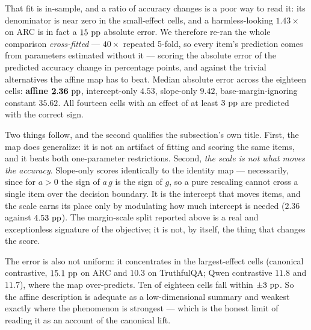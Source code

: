 That fit is in-sample, and a ratio of accuracy changes is a poor way to read it: its
denominator is near zero in the small-effect cells, and a harmless-looking $1.43\times$
on ARC is in fact a $15\,\,\mathrm{pp}$ absolute error. We therefore re-ran the whole comparison
\emph{cross-fitted} --- $40 \times$ repeated 5-fold, so every item's prediction comes
from parameters estimated without it --- scoring the absolute error of the predicted
accuracy change in percentage points, and against the trivial alternatives the affine
map has to beat. Median absolute error across the eighteen cells: \textbf{affine
$\mathbf{2.36\,\,\mathrm{pp}}$}, intercept-only $4.53$, slope-only $9.42$, base-margin-ignoring
constant $35.62$. All fourteen cells with an effect of at least $3\,\,\mathrm{pp}$ are predicted
with the correct sign.

Two things follow, and the second qualifies the subsection's own title. First, the map
does generalize: it is not an artifact of fitting and scoring the same items, and it
beats both one-parameter restrictions. Second, \emph{the scale is not what moves the
accuracy}. Slope-only scores identically to the identity map --- necessarily, since for
$a > 0$ the sign of $a\,g$ is the sign of $g$, so a pure rescaling cannot cross a single
item over the decision boundary. It is the intercept that moves items, and the scale
earns its place only by modulating how much intercept is needed ($2.36$ against
$4.53\,\,\mathrm{pp}$). The margin-scale split reported above is a real and exceptionless
signature of the objective; it is not, by itself, the thing that changes the score.

The error is also not uniform: it concentrates in the largest-effect cells (canonical
contrastive, $15.1\,\,\mathrm{pp}$ on ARC and $10.3$ on TruthfulQA; Qwen contrastive $11.8$ and
$11.7$), where the map over-predicts. Ten of eighteen cells fall within $\pm 3\,\,\mathrm{pp}$.
So the affine description is adequate as a low-dimensional summary and weakest exactly
where the phenomenon is strongest --- which is the honest limit of reading it as an
account of the canonical lift.

